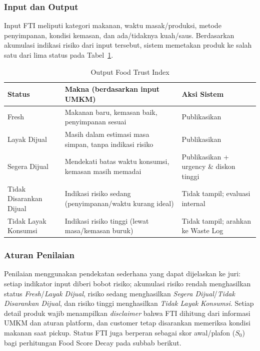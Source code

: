 \subsubsection{Input dan Output}

Input FTI meliputi kategori makanan, waktu masak/produksi, metode penyimpanan, kondisi kemasan, dan
ada/tidaknya kuah/saus. Berdasarkan akumulasi indikasi risiko dari input tersebut, sistem
memetakan produk ke salah satu dari lima status pada Tabel~\ref{tab:fti}.

\begin{table}[htbp]
\centering
\caption{Output Food Trust Index}
\label{tab:fti}
\small
\begin{tabularx}{\textwidth}{|l|X|l|}
\hline
\textbf{Status} & \textbf{Makna (berdasarkan input UMKM)} & \textbf{Aksi Sistem} \\
\hline
Fresh & Makanan baru, kemasan baik, penyimpanan sesuai & Publikasikan \\
\hline
Layak Dijual & Masih dalam estimasi masa simpan, tanpa indikasi risiko & Publikasikan \\
\hline
Segera Dijual & Mendekati batas waktu konsumsi, kemasan masih memadai & Publikasikan + urgency \& diskon tinggi \\
\hline
Tidak Disarankan Dijual & Indikasi risiko sedang (penyimpanan/waktu kurang ideal) & Tidak tampil; evaluasi internal \\
\hline
Tidak Layak Konsumsi & Indikasi risiko tinggi (lewat masa/kemasan buruk) & Tidak tampil; arahkan ke Waste Log \\
\hline
\end{tabularx}
\end{table}

\subsubsection{Aturan Penilaian}

Penilaian menggunakan pendekatan sederhana yang dapat dijelaskan ke juri: setiap indikator input
diberi bobot risiko; akumulasi risiko rendah menghasilkan status \emph{Fresh}/\emph{Layak Dijual},
risiko sedang menghasilkan \emph{Segera Dijual}/\emph{Tidak Disarankan Dijual}, dan risiko tinggi
menghasilkan \emph{Tidak Layak Konsumsi}. Setiap detail produk wajib menampilkan \textit{disclaimer}
bahwa FTI dihitung dari informasi UMKM dan aturan platform, dan customer tetap disarankan memeriksa
kondisi makanan saat pickup. Status FTI juga berperan sebagai skor awal/plafon ($S_0$) bagi
perhitungan Food Score Decay pada subbab berikut.

